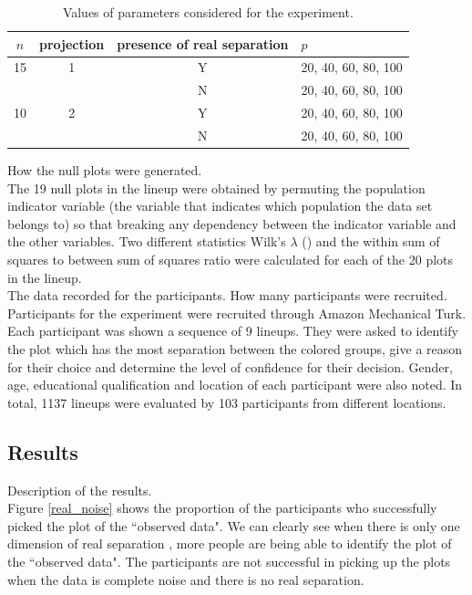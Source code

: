 \documentclass[12]{article}
\begin{document}
\begin{table}[htbp]
\begin{center}
\caption{Values of parameters considered for the experiment.}
\begin{tabular}{cccp{3cm}}
  \hline
  \hline
  $n$ & projection & presence of real separation & $p$ \\
  \hline
  15 & 1 & Y & 20, 40, 60, 80, 100 \\
      & & N & 20, 40, 60, 80, 100\\
   10 & 2 & Y & 20, 40, 60, 80, 100 \\
     & & N & 20, 40, 60, 80, 100\\   
      \hline
\end{tabular}
\label{freq}
\end{center}
\end{table}
{\color{red} How the null plots were generated. }\\
The 19 null plots in the lineup were obtained by  permuting the population indicator variable (the variable that indicates which population the data set belongs to) so that breaking any dependency between the indicator variable and the other variables. Two different statistics Wilk's $\lambda$ (\cite{JW02})  and the within sum of squares to between sum of squares ratio were calculated for each of the 20 plots in the lineup. \\
{\color{red} The data recorded for the participants. How many participants were recruited.} \\
Participants  for the experiment were recruited through Amazon Mechanical Turk. Each participant was shown a sequence of 9 lineups. They were asked to identify the plot which has the most separation between the colored groups, give a reason for their choice and determine the level of confidence for their decision.  Gender, age, educational qualification and location of each participant were also noted. In total, 1137 lineups were evaluated by 103 participants from different locations. \\

\subsection{Results}

{\color{red} Description of the results. }\\

Figure \ref{real_noise} shows the proportion of the participants who successfully picked the plot of the ``observed data". We can clearly see when there is only one dimension of real separation , more people are being able to identify the plot of the ``observed data". The participants are not successful in picking up the plots when the data is complete noise and there is no real separation. 
\end{document}
